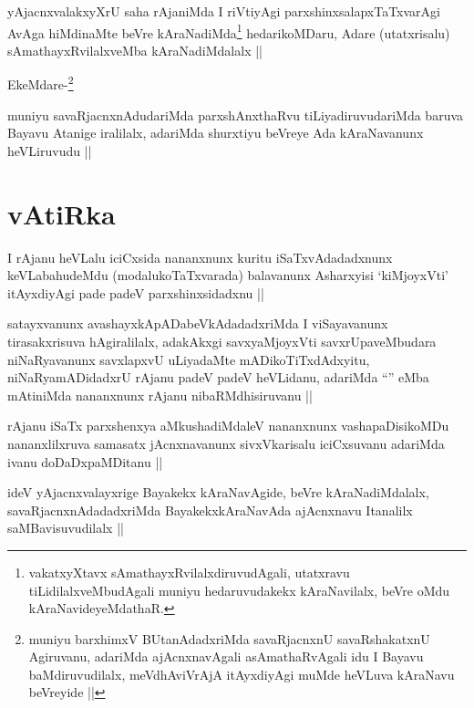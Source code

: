 \begin{artha}
yAjacnxvalakxyXrU saha rAjaniMda I riVtiyAgi parxshinxsalapxTaTxvarAgi
AvAga hiMdinaMte beVre kAraNadiMda\footnote[3]{vakatxyXtavx
  sAmathayxRvilalxdiruvudAgali, utatxravu tiLidilalxveMbudAgali muniyu
hedaruvudakekx kAraNavilalx, beVre oMdu kAraNavideyeMdathaR.} hedarikoMDaru, Adare
(utatxrisalu) sAmathayxRvilalxveMba kAraNadiMdalalx ||

EkeMdare-\footnote[4]{muniyu barxhimxV BUtanAdadxriMda savaRjacnxnU
  savaRshakatxnU Agiruvanu, adariMda ajAcnxnavAgali asAmathaRvAgali
  idu I Bayavu baMdiruvudilalx, meVdhAviVrAjA itAyxdiyAgi muMde
  heVLuva kAraNavu beVreyide ||}
\end{artha}

\begin{artha}
muniyu savaRjacnxnAdudariMda parxshAnxthaRvu tiLiyadiruvudariMda
baruva Bayavu Atanige iralilalx, adariMda shurxtiyu beVreye Ada
kAraNavanunx heVLiruvudu ||
\end{artha}

\section*{vAtiRka}

\begin{artha}
I rAjanu heVLalu iciCxsida nananxnunx kuritu iSaTxvAdadadxnunx
keVLabahudeMdu (modalukoTaTxvarada) balavanunx Asharxyisi `kiMjoyxVti'
itAyxdiyAgi pade padeV parxshinxsidadxnu ||
\end{artha}

\begin{artha}
satayxvanunx avashayxkApADabeVkAdadadxriMda I viSayavanunx
tirasakxrisuva hAgiralilalx, adakAkxgi savxyaMjoyxVti
savxrUpaveMbudara niNaRyavanunx savxlapxvU uLiyadaMte
mADikoTiTxdAdxyitu, niNaRyamADidadxrU rAjanu padeV padeV heVLidanu,
adariMda ``\stext'' eMba mAtiniMda nananxnunx rAjanu nibaRMdhisiruvanu ||
\end{artha}

\begin{artha}
rAjanu iSaTx parxshenxya aMkushadiMdaleV nananxnunx vashapaDisikoMDu
nananxlilxruva samasatx jAcnxnavanunx sivxVkarisalu iciCxsuvanu
adariMda ivanu doDaDxpaMDitanu ||
\end{artha}

\begin{artha}
ideV yAjacnxvalayxrige Bayakekx kAraNavAgide, beVre kAraNadiMdalalx,
savaRjacnxnAdadadxriMda BayakekxkAraNavAda ajAcnxnavu Itanalilx
saMBavisuvudilalx ||
\end{artha}

